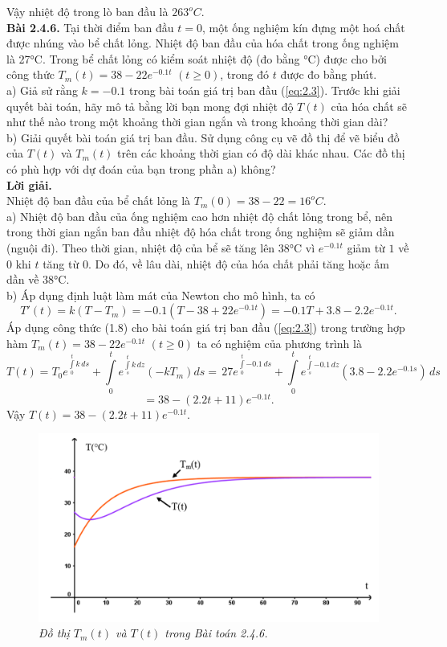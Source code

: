 Vậy nhiệt độ trong lò ban đầu là ${{263}^{o}}C.$ \\
\textbf{Bài 2.4.6. }Tại thời điểm ban đầu $t=0$, một ống nghiệm kín đựng một hoá chất được nhúng vào bể chất lỏng. Nhiệt độ ban đầu của hóa chất trong ống nghiệm là 27°C. Trong bể chất lỏng có kiểm soát nhiệt độ (đo bằng °C) được cho bởi công thức ${{T}_{m}}(t)=38-22{{e}^{-0.1t}}\,\,(t\ge 0)$, trong đó $t$ được đo bằng phút.\\
a) Giả sử rằng $k=-0.1$ trong bài toán giá trị ban đầu (\ref{eq:2.3}). Trước khi giải quyết bài 
toán, hãy mô tả bằng lời bạn mong đợi nhiệt độ $T(t)$ của hóa chất sẽ như thế nào trong một khoảng thời gian ngắn và trong khoảng thời gian dài?\\
b) Giải quyết bài toán giá trị ban đầu. Sử dụng công cụ vẽ đồ thị để vẽ biểu đồ của 
$T(t) $ và ${{T}_{m}}(t)$  trên các khoảng thời gian có độ dài khác nhau. Các đồ thị có phù hợp với dự đoán của bạn trong phần a) không?\\
\textbf{Lời giải.}\\
Nhiệt độ ban đầu của bể chất lỏng là ${{T}_{m}}(0)=38-22={{16}^{o}}C$. \\
a) Nhiệt độ ban đầu của ống nghiệm cao hơn nhiệt độ chất lỏng trong bể, nên trong thời gian ngắn ban đầu nhiệt độ hóa chất trong ống nghiệm sẽ giảm dần (nguội đi). Theo thời gian, nhiệt độ của bể sẽ tăng lên 38°C vì ${{e}^{-0.1t}}$  giảm từ $1$ về $0$ khi $t$ tăng từ $0$. Do đó, về lâu dài, nhiệt độ của hóa chất phải tăng hoặc ấm dần về  38°C.\\
b) Áp dụng định luật làm mát của Newton cho mô hình, ta có 
$${T}'(t)=k\left( T-{{T}_{m}} \right)=-0.1\left( T-38+22{{e}^{-0.1t}} \right)=-0.1T+3.8-2.2{{e}^{-0.1t}}.$$
Áp dụng công thức (1.8) cho bài toán giá trị ban đầu (\ref{eq:2.3}) trong trường hợp hàm ${{T}_{m}}(t)=38-22{{e}^{-0.1t}}\,\,(t\ge 0)$ ta có nghiệm của phương trình là
\[T(t)={{T}_{0}}{{e}^{\int\limits_{0}^{t}{k\,ds}}}+\int\limits_{0}^{t}{{{e}^{\int\limits_{s}^{t}{k\,dz}}}}(-k{{T}_{m}})ds=\,27{{e}^{\int\limits_{0}^{t}{-0.1\,ds}}}+\int\limits_{0}^{t}{{{e}^{\int\limits_{s}^{t}{-0.1\,dz}}}}(3.8-2.2{{e}^{-0.1s}})\,ds\] \[=38-(2.2t+11){{e}^{-0.1t}}.\]
Vậy $T(t)=38-(2.2t+11){{e}^{-0.1t}}$.
\begin{figure}[H]
	\centering
	\includegraphics[scale=0.5]{Images/hinh_2_9.png}
	\caption[Đồ thị ${{T}_{m}}(t)$ và $T(t)$ trong Bài toán 2.4.6.]{\itshape\fontsize{13pt}{0pt}\selectfont\centering Đồ thị ${{T}_{m}}(t)$ và $T(t)$ trong Bài toán 2.4.6. }
	\label{hinh2.9}
\end{figure}
